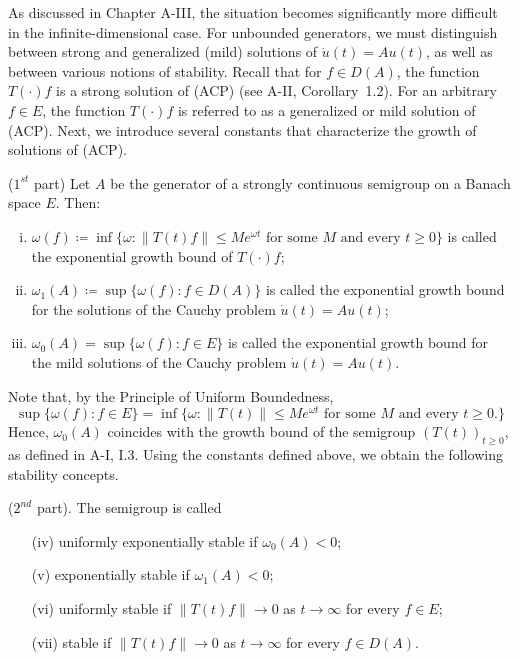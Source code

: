 As discussed in Chapter A-III, the situation becomes significantly more difficult in the infinite-dimensional case. 
For unbounded generators, we must distinguish between strong and generalized (mild) solutions of $\dot{u}(t) = Au(t)$, as well as between various notions of stability. 
Recall that for $f \in D(A)$, the function $T(\cdot)f$ is a strong solution of (ACP) (see A-II, Corollary~1.2). 
For an arbitrary $f \in E$, the function $T(\cdot)f$ is referred to as a generalized or mild solution of (ACP). 
Next, we introduce several constants that characterize the growth of solutions of (ACP).
\begin{definition}($1^{st}$ part)\label{def:a4-1.1}
Let $A$ be the generator of a strongly continuous semigroup on a Banach space $E$. 
Then:
\begin{enumerate}[(i)]
\item $\omega(f) \coloneqq \inf\{\omega : \|T(t)f\| \leq Me^{\omega t} \text{ for some } M \text{ and every } t \geq 0\}$ is called the exponential growth bound of $T(\cdot)f$;
\item $\omega_{1}(A) \coloneqq \sup\{\omega(f) : f \in D(A)\}$ is called the exponential growth bound for the solutions of the Cauchy problem $\dot{u}(t) = Au(t)$;
\item $\omega_0(A) = \sup\{\omega(f) : f \in E\}$ is called the exponential growth bound for the mild solutions of the Cauchy problem $\dot{u}(t) = Au(t)$.
\end{enumerate}
\end{definition}
Note that, by the Principle of Uniform Boundedness, 
\[
\sup\{\omega(f) \colon f \in E\} 
= \inf \{ \omega \colon \|T(t)\| \leq Me^{\omega t} 
    \text{ for some $M$ and every $t \geq 0 $.}\}
\]
Hence, $\omega_0(A)$ coincides with the growth bound of the semigroup $(T(t))_{t \geq 0}$, as defined in A-I, I.3. 
Using the constants defined above, we obtain the following stability concepts.
\begin{definition}($2^{nd}$ part). 
The semigroup is called
\begin{enumerate}
\item[(iv)] uniformly exponentially stable if $\omega_0(A) < 0$;
\item[(v)] exponentially stable if $\omega_{1}(A) < 0$;
\item[(vi)] uniformly stable if $\|T(t)f\| \to 0$ as $t \to \infty$ for every $f \in E$;
\item[(vii)] stable if $\|T(t)f\| \to 0$ as $t \to \infty$ for every $f \in D(A)$.
\end{enumerate}
\end{definition}
